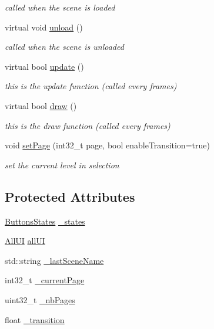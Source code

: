 \begin{DoxyCompactItemize}
\begin{DoxyCompactList}\small\item\em called when the scene is loaded \end{DoxyCompactList}\item 
\mbox{\label{class_scene_help_a4087ac75d635f5a5584fada9ec7b664e}} 
virtual void \hyperlink{class_scene_help_a4087ac75d635f5a5584fada9ec7b664e}{unload} ()
\begin{DoxyCompactList}\small\item\em called when the scene is unloaded \end{DoxyCompactList}\item 
virtual bool \hyperlink{class_scene_help_aa5170e0722a6aecbfeea1f920d09cff7}{update} ()
\begin{DoxyCompactList}\small\item\em this is the update function (called every frames) \end{DoxyCompactList}\item 
virtual bool \hyperlink{class_scene_help_a8f6cc7a52fe41d06815ff10a9ac941a2}{draw} ()
\begin{DoxyCompactList}\small\item\em this is the draw function (called every frames) \end{DoxyCompactList}\item 
void \hyperlink{class_scene_help_a176c192d334d8e0a9be2eea5ed3a60f8}{set\+Page} (int32\+\_\+t page, bool enable\+Transition=true)
\begin{DoxyCompactList}\small\item\em set the current level in selection \end{DoxyCompactList}\end{DoxyCompactItemize}
\subsection*{Protected Attributes}
\begin{DoxyCompactItemize}
\item 
\hyperlink{struct_scene_help_1_1_buttons_states}{Buttons\+States} \hyperlink{class_scene_help_aea1e6baffbdcee7cd8792ebfa15fbaae}{\+\_\+states}
\item 
\hyperlink{struct_scene_help_1_1_all_u_i}{All\+UI} \hyperlink{class_scene_help_a81b24ca15d36e6e5fb6e25d074a81c40}{all\+UI}
\item 
std\+::string \hyperlink{class_scene_help_a9997dedbcb6da1dbed92242a211b0484}{\+\_\+last\+Scene\+Name}
\item 
int32\+\_\+t \hyperlink{class_scene_help_abf3bcfbc83476e78d91dd23be4652a47}{\+\_\+current\+Page}
\item 
uint32\+\_\+t \hyperlink{class_scene_help_a0f208f261ca99f8acc3389c191c67d14}{\+\_\+nb\+Pages}
\item 
float \hyperlink{class_scene_help_a8af54e472c2936530460731d84d59f32}{\+\_\+transition}
\end{DoxyCompactItemize}
